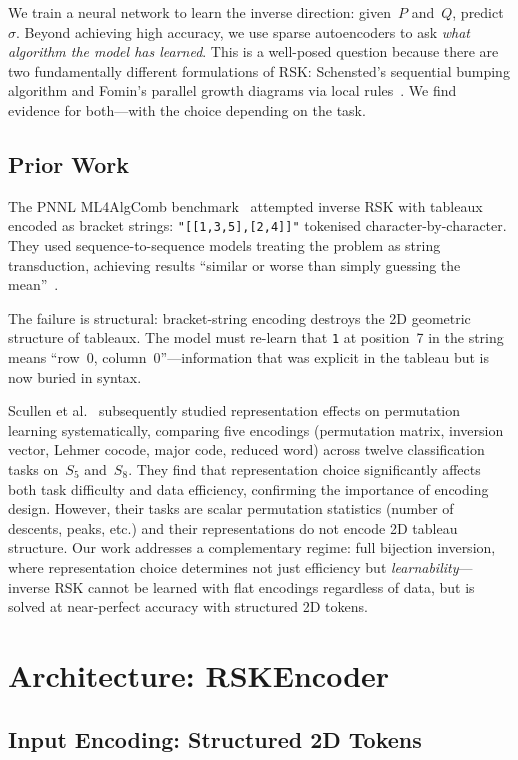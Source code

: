 \documentclass[11pt,a4paper]{article}
\begin{document}
We train a neural network to learn the inverse direction: given~$P$ and~$Q$, predict~$\sigma$. Beyond achieving high accuracy, we use sparse autoencoders to ask \emph{what algorithm the model has learned}. This is a well-posed question because there are two fundamentally different formulations of RSK: Schensted's sequential bumping algorithm and Fomin's parallel growth diagrams via local rules~\cite{langer2013}. We find evidence for both---with the choice depending on the task.

\subsection{Prior Work}

The PNNL ML4AlgComb benchmark~\cite{pnnl} attempted inverse RSK with tableaux encoded as bracket strings: \texttt{"[[1,3,5],[2,4]]"} tokenised character-by-character. They used sequence-to-sequence models treating the problem as string transduction, achieving results ``similar or worse than simply guessing the mean''~\cite{pnnl}.

The failure is structural: bracket-string encoding destroys the 2D geometric structure of tableaux. The model must re-learn that \texttt{1} at position~7 in the string means ``row~0, column~0''---information that was explicit in the tableau but is now buried in syntax.

Scullen et al.~\cite{scullen2025} subsequently studied representation effects on permutation learning systematically, comparing five encodings (permutation matrix, inversion vector, Lehmer cocode, major code, reduced word) across twelve classification tasks on~$S_5$ and~$S_8$. They find that representation choice significantly affects both task difficulty and data efficiency, confirming the importance of encoding design. However, their tasks are scalar permutation statistics (number of descents, peaks, etc.) and their representations do not encode 2D tableau structure. Our work addresses a complementary regime: full bijection inversion, where representation choice determines not just efficiency but \emph{learnability}---inverse RSK cannot be learned with flat encodings regardless of data, but is solved at near-perfect accuracy with structured 2D tokens.

\section{Architecture: RSKEncoder}

\subsection{Input Encoding: Structured 2D Tokens}
\end{document}
